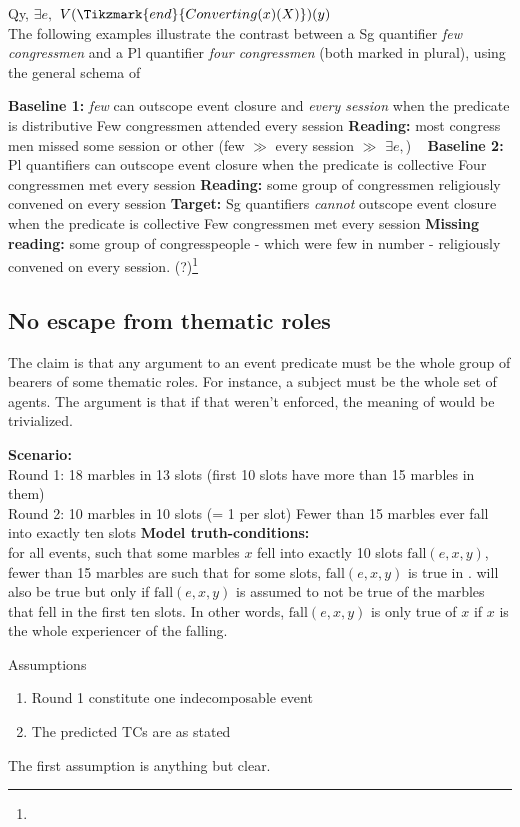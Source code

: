 \documentclass[english]{article}
\begin{document}
\ex
{}\hspace{1.5ex} Qy,\hspace{1.5ex} $\exists e,$\hspace{1.5ex} $V(\Tikzmark{end}{Converting(x)(X)})(y)$\\
\xe
%
The following examples illustrate the contrast between a Sg quantifier \emph{few congressmen} and a Pl quantifier \emph{four congressmen} (both marked in plural), using the general schema of \clastx

\pex \textbf{Baseline 1:} \emph{few} can outscope event closure and \emph{every session} when the predicate is distributive
\a Few congressmen attended every session
\a \textbf{Reading:} most congress men missed some session or other (few $\gg$ every session $\gg$ $\exists e,$)
\xe
%
\pex~ \textbf{Baseline 2:} Pl quantifiers can outscope event closure when the predicate is collective
\a Four congressmen met every session
\a \textbf{Reading:} some group of congressmen religiously convened on every session
\xe
%
\pex \textbf{Target:} Sg quantifiers \emph{cannot} outscope event closure when the predicate is collective
\a Few congressmen met every session
\a \textbf{Missing reading:} some group of congresspeople - which were few in number - religiously convened on every session. (?)\footnote{}
\xe
%

\subsection{No escape from thematic roles}

The claim is that any argument to an event predicate must be the whole group of bearers of some thematic roles. For instance, a subject must be the whole set of agents. The argument is that if that weren't enforced, the meaning of \cnextx would be trivialized.

\pex
\a \textbf{Scenario:} \\
Round 1: 18 marbles in 13 slots (first 10 slots have more than 15 marbles in them) \\
Round 2: 10 marbles in 10 slots (= 1 per slot)
\a Fewer than 15 marbles ever fall into exactly ten slots
\a \textbf{Model truth-conditions:} \\
for all events, such that some marbles $x$ fell into exactly 10 slots $\text{fall}(e, x, y)$,
fewer than 15 marbles are such that for some slots, $\text{fall}(e, x, y)$
\xe
%
 is true in .  will also be true but only if $\text{fall}(e, x, y)$ is assumed to not be true of the marbles that fell in the first ten slots. In other words, $\text{fall}(e, x, y)$ is only true of $x$ if $x$ is the whole experiencer of the falling.

\begin{boxy}{Assumptions}
\begin{enumerate}
\item Round 1 constitute one indecomposable event
\item The predicted TCs are as stated
\end{enumerate}
\end{boxy}
%
The first assumption is anything but clear. 
\end{document}
